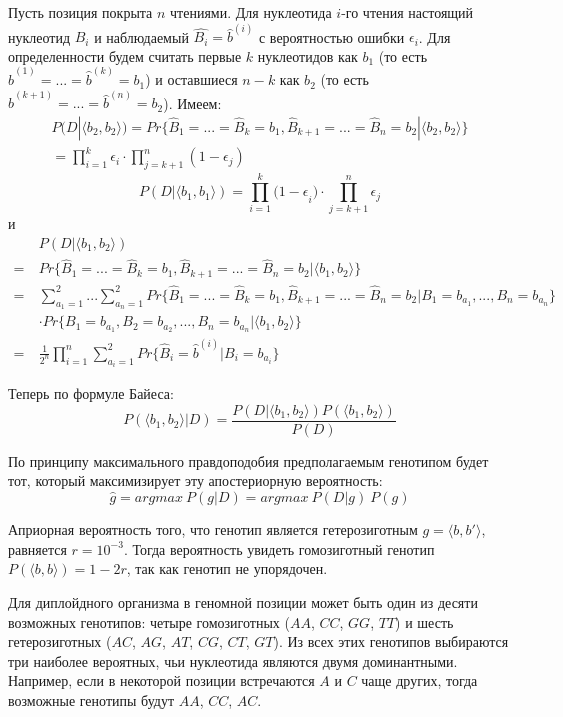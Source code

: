 Пусть позиция покрыта $n$ чтениями. Для нуклеотида $i$-го чтения настоящий нуклеотид $B_i$ и наблюдаемый $\hat{B_i} = \hat{b}^{(i)}$ с вероятностью ошибки ${\epsilon}_i$. Для определенности будем считать первые $k$ нуклеотидов как $b_1$ (то есть $\hat{b}^{(1)} = ... = \hat{b}^{(k)} = b_1$) и оставшиеся $n-k$ как $b_2$ (то есть $\hat{b}^{(k+1)} = ... = \hat{b}^{(n)} = b_2$). Имеем:
\begin{eqnarray*}
P(D|\langle b_2, b_2 \rangle) = Pr\{\hat{B}_1 = ... = \hat{B}_k = b_1, \hat{B}_{k+1} = ... = \hat{B}_n = b_2|\langle b_2, b_2 \rangle  \} \\
= \prod_{i=1}^{k}{\epsilon}_i \cdot \prod_{j=k+1}^{n}(1-{\epsilon}_j)
\end{eqnarray*}
$$P(D|\langle b_1, b_1 \rangle) = \prod_{i=1}^{k}{(1 - \epsilon}_i) \cdot \prod_{j=k+1}^{n}{\epsilon}_j$$
и
\begin{align*}
&P(D|\langle b_1, b_2 \rangle) \\
=\ &Pr\{\hat{B}_1 = ... = \hat{B}_k = b_1, \hat{B}_{k+1} = ... = \hat{B}_n = b_2|\langle b_1, b_2 \rangle  \} \\
=\ & \sum_{a_1=1}^2 ... \sum_{a_n=1}^2 Pr \{ \hat{B}_1 = ... = \hat{B}_k = b_1, \hat{B}_{k+1} = ... = \hat{B}_n = b_2|B_1=b_{a_1}, ..., B_n=b_{a_n} \} \\
&\cdot Pr \{B_1 = b_{a_1}, B_2 = b_{a_2}, ..., B_n = b_{a_n}|\langle b_1, b_2 \rangle\} \\
=\ &\frac{1}{2^n} \prod_{i=1}^{n} \sum_{a_i = 1}^{2} Pr \{\hat{B}_i = \hat{b}^{(i)} | B_i = b_{a_i}\}
\end{align*}

Теперь по формуле Байеса:
$$P(\langle b_1, b_2 \rangle | D) = \frac {P(D|\langle b_1, b_2 \rangle) P(\langle b_1, b_2 \rangle)} {P(D)}$$

По принципу максимального правдоподобия предполагаемым генотипом будет тот, который максимизирует эту апостериорную вероятность:
$$\hat{g} = argmax\ P(g | D) = argmax\ P(D|g)\ P(g)$$

Априорная вероятность того, что генотип является гетерозиготным $g=\langle b, b' \rangle$, равняется $r = 10^{-3}$. Тогда вероятность увидеть гомозиготный генотип $P(\langle b, b \rangle)  = 1 - 2r$, так как генотип не упорядочен. 

Для диплойдного организма в геномной позиции может быть один из десяти возможных генотипов: четыре гомозиготных ($AA$, $CC$, $GG$, $TT$) и шесть гетерозиготных ($AC$, $AG$, $AT$, $CG$, $CT$, $GT$). Из всех этих генотипов выбираются три наиболее вероятных, чьи нуклеотида являются двумя доминантными. Например, если в некоторой позиции встречаются $A$ и $C$ чаще других, тогда возможные генотипы будут $AA$, $CC$, $AC$.

